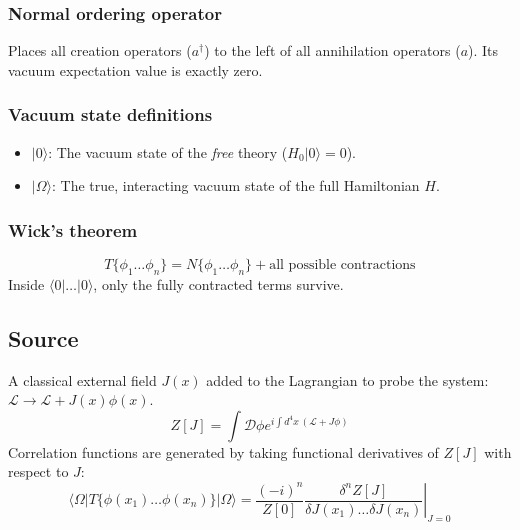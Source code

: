 \documentclass{article}
\begin{document}
\subsubsection*{Normal ordering operator}
Places all creation operators ($a^\dagger$) to the left of all annihilation operators ($a$). Its vacuum expectation value is exactly zero.
\subsubsection*{Vacuum state definitions}
\begin{itemize}
    \item $|0\rangle$: The vacuum state of the \textit{free} theory ($H_0 |0\rangle = 0$).
    \item $|\Omega\rangle$: The true, interacting vacuum state of the full Hamiltonian $H$.
\end{itemize}
\subsubsection*{Wick's theorem}
\begin{equation}
    T\{\phi_1 \dots \phi_n\} = N\{\phi_1 \dots \phi_n\} + \text{all possible contractions}
\end{equation}
Inside $\langle 0 | \dots | 0 \rangle$, only the fully contracted terms survive.

\subsection{Source}
A classical external field $J(x)$ added to the Lagrangian to probe the system: $\mathcal{L} \to \mathcal{L} + J(x)\phi(x)$.
\begin{equation}
    Z[J] = \int \mathcal{D}\phi e^{i \int d^4x \, (\mathcal{L} + J\phi)}
\end{equation}
Correlation functions are generated by taking functional derivatives of $Z[J]$ with respect to $J$:
\begin{equation}
    \langle \Omega | T\{\phi(x_1) \dots \phi(x_n)\} | \Omega \rangle = \left. \frac{(-i)^n}{Z[0]} \frac{\delta^n Z[J]}{\delta J(x_1) \dots \delta J(x_n)} \right|_{J=0}
\end{equation}
\end{document}
